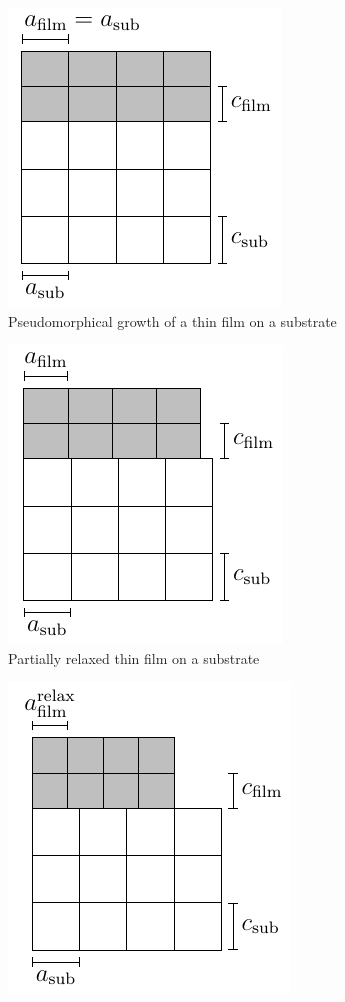 \documentclass[10pt, twocolumn]{article}
\begin{document}
\begin{figure}
    \centering
    \begin{subfigure}{0.3\linewidth}
        \includegraphics{../assets/pseudomorphic.pdf}
        \caption{Pseudomorphical growth of a thin film on a substrate}
    \end{subfigure}
    \begin{subfigure}{0.3\linewidth}
        \includegraphics{../assets/partially_relaxed.pdf}
        \caption{Partially relaxed thin film on a substrate}
    \end{subfigure}
        \begin{subfigure}{0.3\linewidth}
        \includegraphics{../assets/fully_relaxed.pdf}

\end{subfigure}
\end{figure}
\end{document}
